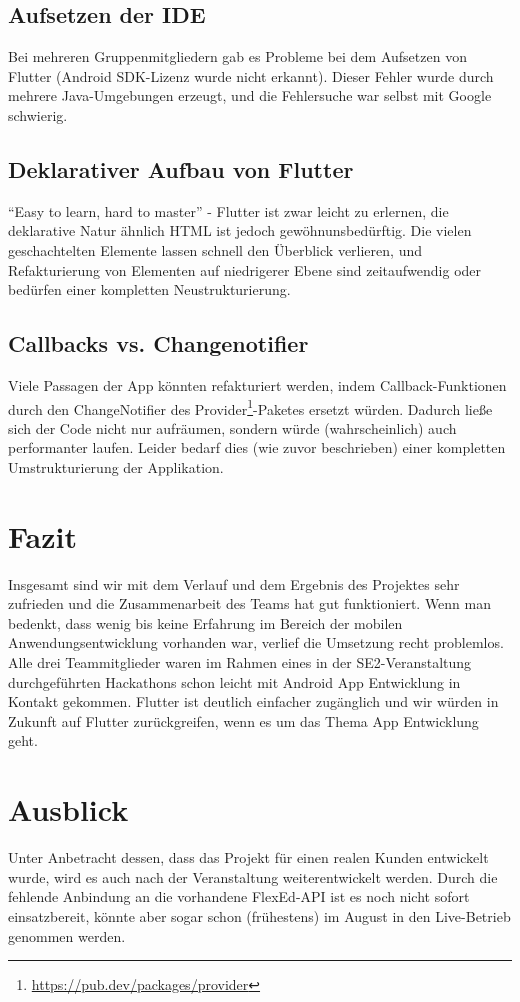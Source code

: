 \documentclass[
  a4paper,
  DIV=10,
  oneside,
  BCOR=5mm,
  parskip=half,
  numbers=noenddot
]{scrreprt}
\begin{document}
\subsection{Aufsetzen der IDE}
Bei mehreren Gruppenmitgliedern gab es Probleme bei dem Aufsetzen von Flutter (Android SDK-Lizenz wurde nicht erkannt). Dieser Fehler wurde durch mehrere Java-Umgebungen erzeugt, und die Fehlersuche war selbst mit Google schwierig.

\subsection{Deklarativer Aufbau von Flutter}
``Easy to learn, hard to master'' - Flutter ist zwar leicht zu erlernen, die deklarative Natur ähnlich HTML ist jedoch gewöhnunsbedürftig. Die vielen geschachtelten Elemente lassen schnell den Überblick verlieren, und Refakturierung von Elementen auf niedrigerer Ebene sind zeitaufwendig oder bedürfen einer kompletten Neustrukturierung.

\subsection{Callbacks vs. Changenotifier}
Viele Passagen der App könnten refakturiert werden, indem Callback-Funktionen durch den ChangeNotifier des Provider\footnote{\url{https://pub.dev/packages/provider}}-Paketes ersetzt würden. Dadurch ließe sich der Code nicht nur aufräumen, sondern würde (wahrscheinlich) auch performanter laufen. Leider bedarf dies (wie zuvor beschrieben) einer kompletten Umstrukturierung der Applikation.

\section{Fazit}
Insgesamt sind wir mit dem Verlauf und dem Ergebnis des Projektes sehr zufrieden und die Zusammenarbeit des Teams hat gut funktioniert. Wenn man bedenkt, dass wenig bis keine Erfahrung im Bereich der mobilen Anwendungsentwicklung vorhanden war, verlief die Umsetzung recht problemlos. 
Alle drei Teammitglieder waren im Rahmen eines in der SE2-Veranstaltung durchgeführten Hackathons schon leicht mit Android App Entwicklung in Kontakt gekommen. Flutter ist deutlich einfacher zugänglich und wir würden in Zukunft auf Flutter zurückgreifen, wenn es um das Thema App Entwicklung geht. 

\section{Ausblick}
Unter Anbetracht dessen, dass das Projekt für einen realen Kunden entwickelt wurde, wird es auch nach der Veranstaltung weiterentwickelt werden. Durch die fehlende Anbindung an die vorhandene FlexEd-API ist es noch nicht sofort einsatzbereit, könnte aber sogar schon (frühestens) im August in den Live-Betrieb genommen werden.
\end{document}
